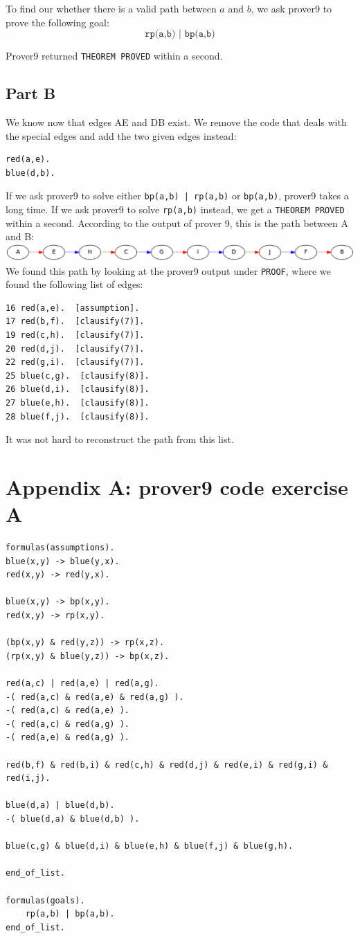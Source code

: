 \documentclass[12pt]{article}
\begin{document}
To find our whether there is a valid path between $a$ and $b$, we ask prover9 to prove the following goal:
\[ \texttt{rp(a,b) | bp(a,b)} \]

Prover9 returned \texttt{THEOREM PROVED} within a second.

\subsection*{Part B}
We know now that edges AE and DB exist.
We remove the code that deals with the special edges and add the two given edges instead:
\begin{verbatim}
red(a,e).
blue(d,b).
\end{verbatim}
If we ask prover9 to solve either \texttt{bp(a,b) | rp(a,b)} or \texttt{bp(a,b)}, prover9 takes a long time. If we ask prover9 to solve \texttt{rp(a,b)} instead, we get a \texttt{THEOREM PROVED} within a second. 
According to the output of prover 9, this is the path between A and B:\\

\includegraphics[width=16cm]{path.png}\\

We found this path by looking at the prover9 output under \texttt{PROOF}, where we found the following list of edges:
\begin{verbatim}
16 red(a,e).  [assumption].
17 red(b,f).  [clausify(7)].
19 red(c,h).  [clausify(7)].
20 red(d,j).  [clausify(7)].
22 red(g,i).  [clausify(7)].
25 blue(c,g).  [clausify(8)].
26 blue(d,i).  [clausify(8)].
27 blue(e,h).  [clausify(8)].
28 blue(f,j).  [clausify(8)].
\end{verbatim}
It was not hard to reconstruct the path from this list.

\clearpage{}

\section*{Appendix A: prover9 code exercise A}
\begin{verbatim}
formulas(assumptions).
blue(x,y) -> blue(y,x).
red(x,y) -> red(y,x).
	
blue(x,y) -> bp(x,y).
red(x,y) -> rp(x,y).

(bp(x,y) & red(y,z)) -> rp(x,z).
(rp(x,y) & blue(y,z)) -> bp(x,z).

red(a,c) | red(a,e) | red(a,g).
-( red(a,c) & red(a,e) & red(a,g) ).
-( red(a,c) & red(a,e) ).
-( red(a,c) & red(a,g) ).
-( red(a,e) & red(a,g) ).

red(b,f) & red(b,i) & red(c,h) & red(d,j) & red(e,i) & red(g,i) & red(i,j).

blue(d,a) | blue(d,b).
-( blue(d,a) & blue(d,b) ).

blue(c,g) & blue(d,i) & blue(e,h) & blue(f,j) & blue(g,h).
	
end_of_list.

formulas(goals).
	rp(a,b) | bp(a,b).
end_of_list.
\end{verbatim}
\end{document}
